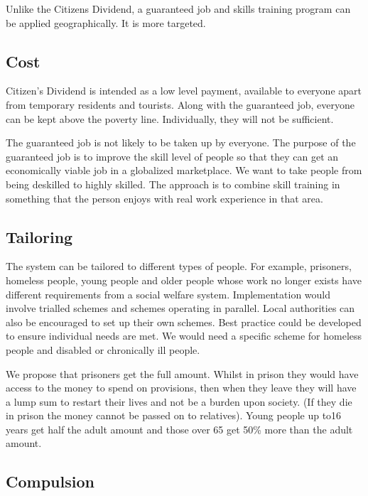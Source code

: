 \documentclass[]{tufte-handout}
\begin{document}
Unlike the Citizens Dividend, a guaranteed job and skills training
program can be applied geographically. It is more targeted.

\hypertarget{cost}{%
\subsection{Cost}\label{cost}}

Citizen's Dividend is intended as a low level payment, available to
everyone apart from temporary residents and tourists. Along with the
guaranteed job, everyone can be kept above the poverty line.
Individually, they will not be sufficient.

The guaranteed job is not likely to be taken up by everyone. The purpose
of the guaranteed job is to improve the skill level of people so that
they can get an economically viable job in a globalized marketplace. We
want to take people from being deskilled to highly skilled. The approach
is to combine skill training in something that the person enjoys with
real work experience in that area.

\hypertarget{tailoring}{%
\subsection{Tailoring}\label{tailoring}}

The system can be tailored to different types of people. For example,
prisoners, homeless people, young people and older people whose work no
longer exists have different requirements from a social welfare system.
Implementation would involve trialled schemes and schemes operating in
parallel. Local authorities can also be encouraged to set up their own
schemes. Best practice could be developed to ensure individual needs are
met. We would need a specific scheme for homeless people and disabled or
chronically ill people.

We propose that prisoners get the full amount. Whilst in prison they
would have access to the money to spend on provisions, then when they
leave they will have a lump sum to restart their lives and not be a
burden upon society. (If they die in prison the money cannot be passed
on to relatives). Young people up to16 years get half the adult amount
and those over 65 get 50\% more than the adult amount.

\hypertarget{compulsion}{%
\subsection{Compulsion}\label{compulsion}}
\end{document}
